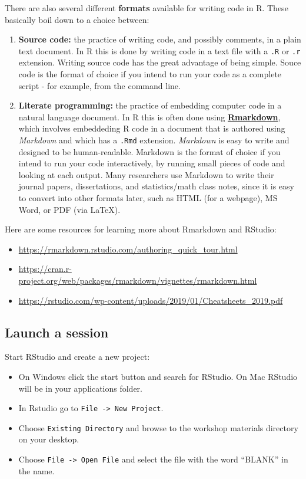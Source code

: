\documentclass[]{book}
\providecommand{\tightlist}{%
  \setlength{\itemsep}{0pt}\setlength{\parskip}{0pt}}
\begin{document}
There are also several different \textbf{formats} available for writing
code in R. These basically boil down to a choice between:

\begin{enumerate}
\def\labelenumi{\arabic{enumi}.}
\item
  \textbf{Source code:} the practice of writing code, and possibly
  comments, in a plain text document. In R this is done by writing code
  in a text file with a \texttt{.R} or \texttt{.r} extension. Writing
  source code has the great advantage of being simple. Souce code is the
  format of choice if you intend to run your code as a complete script -
  for example, from the command line.
\item
  \textbf{Literate programming:} the practice of embedding computer code
  in a natural language document. In R this is often done using
  \href{https://rmarkdown.rstudio.com/}{\textbf{Rmarkdown}}, which
  involves embeddeding R code in a document that is authored using
  \emph{Markdown} and which has a \texttt{.Rmd} extension.
  \emph{Markdown} is easy to write and designed to be human-readable.
  Markdown is the format of choice if you intend to run your code
  interactively, by running small pieces of code and looking at each
  output. Many researchers use Markdown to write their journal papers,
  dissertations, and statistics/math class notes, since it is easy to
  convert into other formats later, such as HTML (for a webpage), MS
  Word, or PDF (via LaTeX).
\end{enumerate}

Here are some resources for learning more about Rmarkdown and RStudio:

\begin{itemize}
\tightlist
\item
  \url{https://rmarkdown.rstudio.com/authoring_quick_tour.html}
\item
  \url{https://cran.r-project.org/web/packages/rmarkdown/vignettes/rmarkdown.html}
\item
  \url{https://rstudio.com/wp-content/uploads/2019/01/Cheatsheets_2019.pdf}
\end{itemize}

\subsection{Launch a session}\label{launch-a-session}

Start RStudio and create a new project:

\begin{itemize}
\tightlist
\item
  On Windows click the start button and search for RStudio. On Mac
  RStudio will be in your applications folder.
\item
  In Rstudio go to \texttt{File\ -\textgreater{}\ New\ Project}.
\item
  Choose \texttt{Existing\ Directory} and browse to the workshop
  materials directory on your desktop.
\item
  Choose \texttt{File\ -\textgreater{}\ Open\ File} and select the file
  with the word ``BLANK'' in the name.
\end{itemize}
\end{document}
